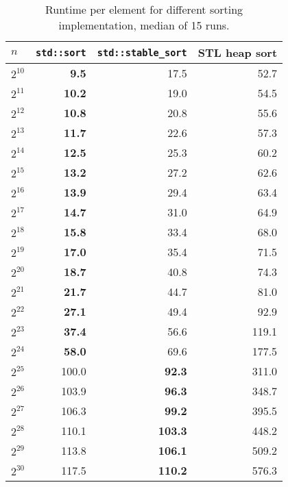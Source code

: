\documentclass{article}
\begin{document}
\begin{table}\centering
\begin{tabular}{l|rrr}
$n$ & \texttt{std::sort} & \texttt{std::stable\_sort} & STL heap sort \\ \hline
$2^{10}$ &  \bf 9.5 &      17.5 &  52.7 \\
$2^{11}$ & \bf 10.2 &      19.0 &  54.5 \\
$2^{12}$ & \bf 10.8 &      20.8 &  55.6 \\
$2^{13}$ & \bf 11.7 &      22.6 &  57.3 \\
$2^{14}$ & \bf 12.5 &      25.3 &  60.2 \\
$2^{15}$ & \bf 13.2 &      27.2 &  62.6 \\
$2^{16}$ & \bf 13.9 &      29.4 &  63.4 \\
$2^{17}$ & \bf 14.7 &      31.0 &  64.9 \\
$2^{18}$ & \bf 15.8 &      33.4 &  68.0 \\
$2^{19}$ & \bf 17.0 &      35.4 &  71.5 \\
$2^{20}$ & \bf 18.7 &      40.8 &  74.3 \\
$2^{21}$ & \bf 21.7 &      44.7 &  81.0 \\
$2^{22}$ & \bf 27.1 &      49.4 &  92.9 \\
$2^{23}$ & \bf 37.4 &      56.6 & 119.1 \\
$2^{24}$ & \bf 58.0 &      69.6 & 177.5 \\
$2^{25}$ &    100.0 &  \bf 92.3 & 311.0 \\
$2^{26}$ &    103.9 &  \bf 96.3 & 348.7 \\
$2^{27}$ &    106.3 &  \bf 99.2 & 395.5 \\
$2^{28}$ &    110.1 & \bf 103.3 & 448.2 \\
$2^{29}$ &    113.8 & \bf 106.1 & 509.2 \\
$2^{30}$ &    117.5 & \bf 110.2 & 576.3 \\
\end{tabular}
\caption{Runtime per element for different sorting implementation, median of 15 runs.}
\end{table}

\begin{comment}
+-------+--------------+
| count |          sum |
+-------+--------------+
|   945 | 24504.381188 |
+-------+--------------+
\end{comment}
\end{document}

